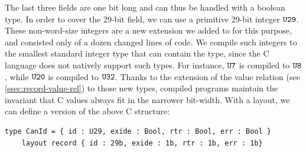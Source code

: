 The last three fields are one bit long and can thus be handled with a \cogent
boolean type.
In order to cover the 29-bit field, we can use a primitive 29-bit integer $\texttt{U29}$. These non-word-size integers are a new extension we added to \cogent for this purpose, and consisted only of a dozen changed lines of code. We compile such integers to
the smallest standard integer type that can contain the type, since the C language does not
natively support such types. For instance, $\texttt{U7}$ is
compiled to $\texttt{U8}$, while $\texttt{U20}$ is compiled to $\texttt{U32}$.
Thanks to the extension of the value relation (see \autoref{ssec:record-value-rel}) 
to those new types, compiled \cogent programs maintain the invariant that C
values always fit in the narrower bit-width. 
%
%
%
%
With a \dargent layout, we can define a \cogent version of the above C structure:
\begin{lstlisting}[language=Cogent]
  type CanId = { id : U29, exide : Bool, rtr : Bool, err : Bool }
    layout record { id : 29b, exide : 1b, rtr : 1b, err : 1b}
\end{lstlisting}

